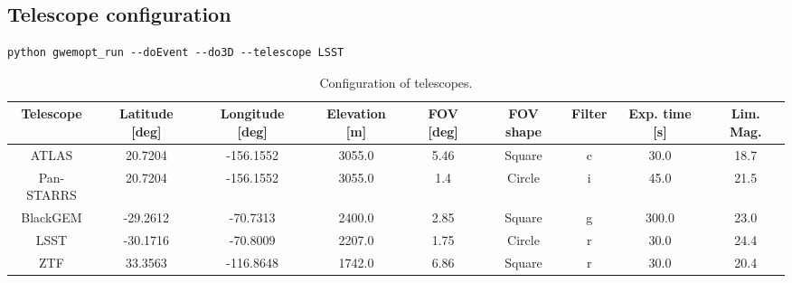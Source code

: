 \documentclass[twocolumn]{aastex62}
\begin{document}
\subsection{Telescope configuration}
\label{subsection:config}
\begin{lstlisting}
python gwemopt_run --doEvent --do3D --telescope LSST
\end{lstlisting}
\begin{table*}[t]
\scriptsize
\centering
\begin{tabular}{|c|c|c|c|c|c|c|c|c|}
\hline
Telescope & Latitude {[}deg{]} & Longitude {[}deg{]} & Elevation {[}m{]} & FOV {[}deg{]} & FOV shape & Filter & Exp. time {[}s{]} & Lim. Mag. \\ \hline
ATLAS          & 20.7204            & -156.1552           & 3055.0            & 5.46                                      & Square              & c      & 30.0                  & 18.7               \\ \hline
Pan-STARRS     & 20.7204            & -156.1552           & 3055.0            & 1.4                                      & Circle              & i      & 45.0                  & 21.5               \\ \hline
BlackGEM       & -29.2612           & -70.7313            & 2400.0            & 2.85 & Square              & g      & 300.0                 & 23.0               \\ \hline
LSST           & -30.1716           & -70.8009            & 2207.0            & 1.75                                      & Circle              & r      & 30.0                  & 24.4               \\ \hline
ZTF            & 33.3563            & -116.8648           & 1742.0            & 6.86  & Square              & r      & 30.0                  & 20.4               \\ \hline
\end{tabular}
\caption{Configuration of telescopes.}
\label{table:config}
\end{table*}
\end{document}
